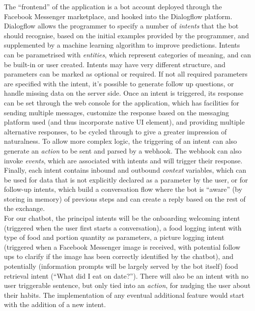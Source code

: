 \documentclass{scrartcl}
\begin{document}
The ``frontend'' of the application is a bot account deployed through the Facebook Messenger marketplace, and hooked into the Dialogflow platform. Dialogflow allows the programmer to specify a number of \textit{intents} that the bot should recognise, based on the initial examples provided by the programmer, and supplemented by a machine learning algorithm to improve predictions. Intents can be parametrised with \textit{entities}, which represent categories of meaning, and can be built-in or user created. Intents may have very different structure, and parameters can be marked as optional or required. If not all required parameters are specified with the intent, it's possible to generate follow up questions, or handle missing data on the server side. Once an intent is triggered, its response can be set through the web console for the application, which has facilities for sending multiple messages, customize the response based on the messaging platform used (and thus incorporate native UI element), and providing multiple alternative responses, to be cycled through to give a greater impression of naturalness. To allow more complex logic, the triggering of an intent can also generate an \textit{action} to be sent and parsed by a webhook. The webhook can also invoke \textit{events}, which are associated with intents and will trigger their response. Finally, each intent contains inbound and outbound \textit{context} variables, which can be used for data that is not explicitly declared as a parameter by the user, or for follow-up intents, which build a conversation flow where the bot is ``aware'' (by storing in memory) of previous steps and can create a reply based on the rest of the exchange. \\

For our chatbot, the principal intents will be the onboarding welcoming intent (triggered when the user first starts a conversation), a food logging intent with type of food and portion quantity as parameters, a picture logging intent (triggered when a Facebook Messenger image is received, with potential follow ups to clarify if the image has been correctly identified by the chatbot), and potentially (information prompts will be largely served by the bot itself) food retrieval intent (``What did I eat on {date}?''). There will also be an intent with no user triggerable sentence, but only tied into an \textit{action}, for nudging the user about their habits. The implementation of any eventual additional feature would start with the addition of a new intent. \\
\end{document}
